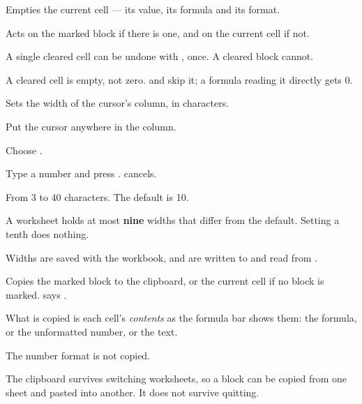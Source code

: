 
Empties the current cell --- its value, its formula and its format.

\begin{ccsteps}
\item Acts on the marked block if there is one, and on the current cell if not.
\item A single cleared cell can be undone with , once. A cleared block
cannot.
\item A cleared cell is empty, not zero.  and  skip it; a
formula reading it directly gets 0.
\end{ccsteps}


Sets the width of the cursor's column, in characters.

\begin{ccprocedure}[]
\item Put the cursor anywhere in the column.
\item Choose .
\item Type a number and press .  cancels.
\end{ccprocedure}

\begin{ccsteps}
\item From 3 to 40 characters. The default is 10.
\item A worksheet holds at most \textbf{nine} widths that differ from the
default. Setting a tenth does nothing.
\item Widths are saved with the workbook, and are written to and read from
.
\end{ccsteps}


Copies the marked block to the clipboard, or the current cell if no block is
marked. \ccprod{} says .

\begin{ccsteps}
\item What is copied is each cell's \emph{contents} as the formula bar shows
them: the formula, or the unformatted number, or the text.
\item The number format is not copied.
\item The clipboard survives switching worksheets, so a block can be copied
from one sheet and pasted into another. It does not survive quitting.
\end{ccsteps}

